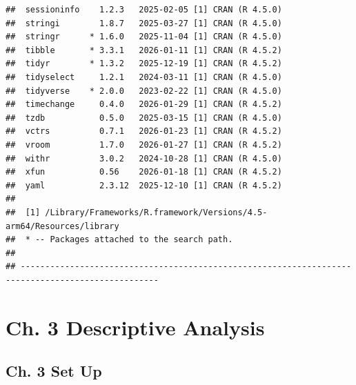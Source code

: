 \documentclass[
]{book}
\begin{document}
\begin{verbatim}
##  sessioninfo    1.2.3   2025-02-05 [1] CRAN (R 4.5.0)
##  stringi        1.8.7   2025-03-27 [1] CRAN (R 4.5.0)
##  stringr      * 1.6.0   2025-11-04 [1] CRAN (R 4.5.0)
##  tibble       * 3.3.1   2026-01-11 [1] CRAN (R 4.5.2)
##  tidyr        * 1.3.2   2025-12-19 [1] CRAN (R 4.5.2)
##  tidyselect     1.2.1   2024-03-11 [1] CRAN (R 4.5.0)
##  tidyverse    * 2.0.0   2023-02-22 [1] CRAN (R 4.5.0)
##  timechange     0.4.0   2026-01-29 [1] CRAN (R 4.5.2)
##  tzdb           0.5.0   2025-03-15 [1] CRAN (R 4.5.0)
##  vctrs          0.7.1   2026-01-23 [1] CRAN (R 4.5.2)
##  vroom          1.7.0   2026-01-27 [1] CRAN (R 4.5.2)
##  withr          3.0.2   2024-10-28 [1] CRAN (R 4.5.0)
##  xfun           0.56    2026-01-18 [1] CRAN (R 4.5.2)
##  yaml           2.3.12  2025-12-10 [1] CRAN (R 4.5.2)
## 
##  [1] /Library/Frameworks/R.framework/Versions/4.5-arm64/Resources/library
##  * -- Packages attached to the search path.
## 
## --------------------------------------------------------------------------------------------------
\end{verbatim}

\section{Ch. 3 Descriptive Analysis}\label{sec:rcode-ch3}

\subsection{Ch. 3 Set Up}\label{ch.-3-set-up}
\end{document}
